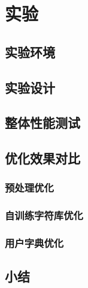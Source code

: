 \chapter{实验}
\label{chap:experiments}

\section{实验环境}
\section{实验设计}


\section{整体性能测试}

\section{优化效果对比}
\subsection{预处理优化}

\subsection{自训练字符库优化}

\subsection{用户字典优化}

\section{小结}
